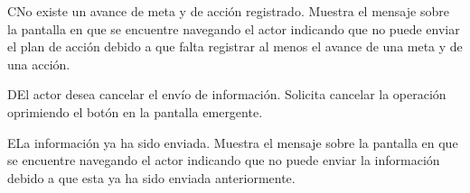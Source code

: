   \begin{UCtrayectoriaA}{C}{No existe un avance de meta y de acción registrado.}
    \UCpaso[\UCsist] Muestra el mensaje  sobre la pantalla en que se encuentre navegando el actor  indicando que no puede enviar el plan de acción debido a que falta registrar al menos el avance de una meta y de una acción. 
 \end{UCtrayectoriaA}
 
     \begin{UCtrayectoriaA}{D}{El actor desea cancelar el envío de información.}
    \UCpaso[\UCactor] Solicita cancelar la operación oprimiendo el botón  en la pantalla emergente.
    \end{UCtrayectoriaA}
    
     \begin{UCtrayectoriaA}{E}{La información ya ha sido enviada.}
    \UCpaso[\UCsist] Muestra el mensaje  sobre la pantalla en que se encuentre navegando el actor indicando que no puede enviar la información debido a que esta ya ha sido enviada anteriormente. 
    \end{UCtrayectoriaA}